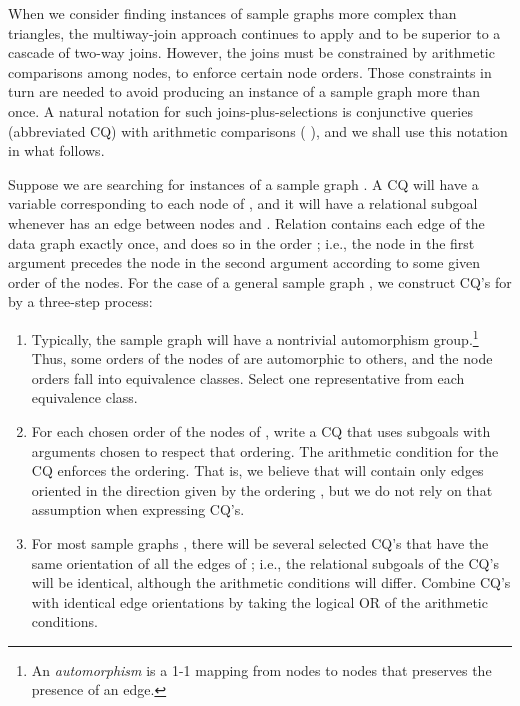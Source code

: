 When we consider finding instances of sample graphs more complex than triangles, the multiway-join approach continues to apply and to be superior to a cascade of two-way joins. However, the joins must be constrained by arithmetic comparisons among nodes, to enforce certain node orders.  Those constraints in turn are needed to avoid producing an instance of a sample graph more than once.  A natural notation for such joins-plus-selections is conjunctive queries (abbreviated CQ) with arithmetic comparisons (\cite{YuOzs} \cite{Gupta}), and we shall use this notation in what follows.

Suppose we are searching for instances of a sample graph .  A CQ will have a variable corresponding to each node of , and it will have a relational subgoal  whenever  has an edge between nodes  and .
Relation  contains each edge of the data graph exactly once, and does so in the order ; i.e., the node in the first argument precedes the node in the second argument according to some given order of the nodes.  For the case of a general sample graph , we construct CQ's for   by a three-step process:

\begin{enumerate}
\item Typically, the sample graph  will have a nontrivial automorphism group.\footnote{An {\em automorphism} is a 1-1 mapping from nodes to nodes that preserves the presence of an edge.} Thus, some orders of the nodes of  are automorphic to others, and the node orders fall into equivalence classes.  Select one representative from each equivalence class.

\item For each chosen order of the nodes of , write a CQ that uses subgoals  with arguments chosen to respect that ordering.  The arithmetic condition for the CQ enforces the ordering.  That is, we believe that  will contain only edges oriented in the direction given by the ordering , but we do not rely on that assumption when expressing CQ's.

\item For most sample graphs , there will be several selected CQ's that have the same orientation of all the edges of ; i.e., the relational subgoals of the CQ's will be identical, although the arithmetic conditions will differ. Combine CQ's with identical edge orientations by taking the logical OR of the arithmetic conditions.
\end{enumerate}

